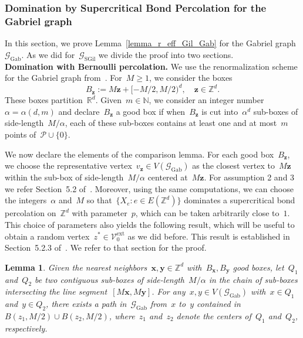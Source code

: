\documentclass[a4paper,11pt]{article}
\newcommand{\RR}{\mathbb{R}}
\newcommand{\NN}{\mathbb{N}}
\newcommand{\ZZ}{\mathbb{Z}}
\newtheorem{lemma}{Lemma}
\theoremstyle{definition}
\begin{document}
\subsubsection{Domination by Supercritical Bond Percolation for the Gabriel graph}\label{ss_dom_Gab}
In this section, we prove Lemma~\ref{lemma_r_eff_Gil_Gab} for the Gabriel graph~$\mathcal G_\mathrm{Gab}$. As we did for~$\mathcal G_\mathrm{SGil}$ we divide the proof into two sections. \\

\noindent\textbf{Domination with Bernoulli percolation.} We use the renormalization scheme for the Gabriel graph from~\cite{recurrenceVoronoiPPP}. For~$M \ge 1$, we consider the boxes
$$ B_\mathbf{z}:= M \mathbf{z} + [-M/2,M/2)^d, \quad \mathbf{z} \in \ZZ^d. $$
These boxes partition~$\RR^d$. Given~$m \in \NN$, we consider an integer number~$\alpha = \alpha(d,m)$ and declare~$B_\mathbf{z}$ a good box if when~$B_\mathbf{z}$ is cut into~$\alpha^d$ sub-boxes of side-length~$M/\alpha$, each of these sub-boxes contains at least one and at most~$m$ points of~$\mathcal P \cup \{0\}$. 

We now declare the elements of the comparison lemma. For each good box~$B_\mathbf{z}$, we choose the representative vertex~$v_\mathbf{z} \in V(\mathcal G_\mathrm{Gab})$ as the closest vertex to~$M\mathbf z$ within the sub-box of side-length~$M/\alpha$ centered at~$M\mathbf{z}$. For assumption 2 and 3 we refer Section~5.2 of~\cite{recurrenceVoronoiPPP}. Moreover, using the same computations, we can choose the integers~$\alpha$ and~$M$ so that~$\{ X_e: e \in E(\ZZ^d) \}$ dominates a supercritical bond percolation on~$\ZZ^d$ with parameter~$p$, which can be taken arbitrarily close to~$1$. This choice of parameters also yields the following result, which will be useful to obtain a random vertex~$z^\ast \in \mathcal V^\mathrm{ext}_0$ as we did before. This result is established in Section~5.2.3 of~\cite{recurrenceVoronoiPPP}. We refer to that section for the proof. 

\begin{lemma}\label{lemma_sub_boxes_Gab}
Given the nearest neighbors~$\mathbf x, \mathbf y \in \ZZ^d$ with~$B_\mathbf{x},B_\mathbf{y}$ good boxes, let~$Q_1$ and~$Q_2$ be two contiguous sub-boxes of side-length~$M/\alpha$ in the chain of sub-boxes intersecting the line segment~$[M\mathbf{x}, M\mathbf{y}]$. For any~$x,y \in V(\mathcal G_\mathrm{Gab})$ with~$x \in Q_1$ and~$y \in Q_2$, there exists a path in~$\mathcal G_{\mathrm{Gab}}$ from~$x$ to~$y$ contained in~$B(z_1, M/2) \cup B(z_2, M/2)$, where~$z_1$ and~$z_2$ denote the centers of~$Q_1$ and~$Q_2$, respectively.
\end{lemma}
\end{document}
